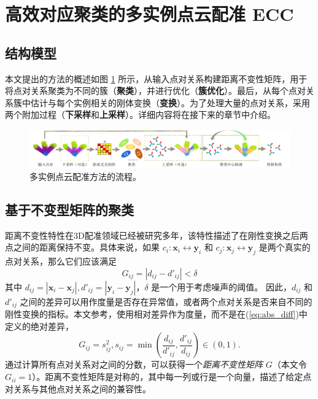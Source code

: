 \section{高效对应聚类的多实例点云配准 ECC}

\subsection{结构模型}
本文提出的方法的概述如图 \ref{fig:multicluster} 所示，从输入点对关系构建距离不变性矩阵，用于将点对关系聚类为不同的簇（\textbf{聚类}），并进行优化（\textbf{簇优化}）。最后，从每个点对关系簇中估计与每个实例相关的刚体变换（\textbf{变换}）。为了处理大量的点对关系，采用两个附加过程（\textbf{下采样}和\textbf{上采样}）。详细内容将在接下来的章节中介绍。

\begin{figure}[ht]
    \centering
    \includegraphics[width=1\textwidth]{images/multi-cluster.pdf}
    \caption{多实例点云配准方法的流程。}
    \label{fig:multicluster}
    \vspace{-0.6in}
\end{figure}

\subsection{基于不变型矩阵的聚类}
\label{subsec:Distance-Consistency-Graph}
距离不变性特性在3D配准领域已经被研究多年\cite{yang2020teaser, shi2021robin,leordeanu2005spectral}，该特性描述了在刚性变换之后两点之间的距离保持不变。具体来说，如果 $c_i :\boldsymbol{x}_i \leftrightarrow \boldsymbol{y}_i$ 和 $c_j : \boldsymbol{x}_j \leftrightarrow \boldsymbol{y}_j$ 是两个真实的点对关系，那么它们应该满足
%
\begin{equation}
G_{ij}=|d_{ij} - d'_{ij} | < \delta
\label{eq:abs_diff}
\end{equation}
其中 $d_{ij} = |\boldsymbol{x}_i-\boldsymbol{x}_j|, d'_{ij}=|\boldsymbol{y}_i -\boldsymbol{y}_j|$，$\delta $ 是一个用于考虑噪声的阈值。
因此，$d_{ij}$ 和 $d'_{ij}$ 之间的差异可以用作度量是否存在异常值，或者两个点对关系是否来自不同的刚性变换的指标。本文参考\cite{matrix}，使用相对差异作为度量，而不是在(\ref{eq:abs_diff})中定义的绝对差异，
\begin{equation}
G_{ij} = s_{ij}^2, s_{ij} = \min( \frac{d_{ij}}{d'_{ij}}, \frac{d'_{ij}}{d_{ij}}) \in (0, 1).
\end{equation}
通过计算所有点对关系对之间的分数，可以获得一个\emph{距离不变性矩阵} $G$（本文令 $G_{ii} = 1$）。距离不变性矩阵是对称的，其中每一列或行是一个向量，描述了给定点对关系与其他点对关系之间的兼容性\cite{reviewof3dourlierremovingjiaqiYang}。

